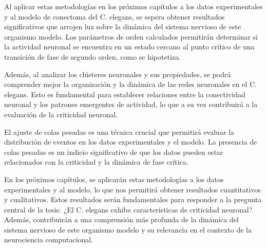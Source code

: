 Al aplicar estas metodologías en los próximos capítulos a los datos experimentales y al modelo de conectoma del C. elegans, se espera obtener resultados significativos que arrojen luz sobre la dinámica del sistema nervioso de este organismo modelo. Los parámetros de orden calculados permitirán determinar si la actividad neuronal se encuentra en un estado cercano al punto crítico de una transición de fase de segundo orden, como se hipotetiza.

Además, al analizar los clústeres neuronales y sus propiedades, se podrá comprender mejor la organización y la dinámica de las redes neuronales en el C. elegans. Esto es fundamental para establecer relaciones entre la conectividad neuronal y los patrones emergentes de actividad, lo que a su vez contribuirá a la evaluación de la criticidad neuronal.

El ajuste de colas pesadas es una técnica crucial que permitirá evaluar la distribución de eventos en los datos experimentales y el modelo. La presencia de colas pesadas es un indicio significativo de que los datos pueden estar relacionados con la criticidad y la dinámica de fase crítica.

En los próximos capítulos, se aplicarán estas metodologías a los datos experimentales y al modelo, lo que nos permitirá obtener resultados cuantitativos y cualitativos. Estos resultados serán fundamentales para responder a la pregunta central de la tesis: ¿El C. elegans exhibe características de criticidad neuronal? Además, contribuirán a una comprensión más profunda de la dinámica del sistema nervioso de este organismo modelo y su relevancia en el contexto de la neurociencia computacional.
 
\cite{kaplan_nested_2020}



